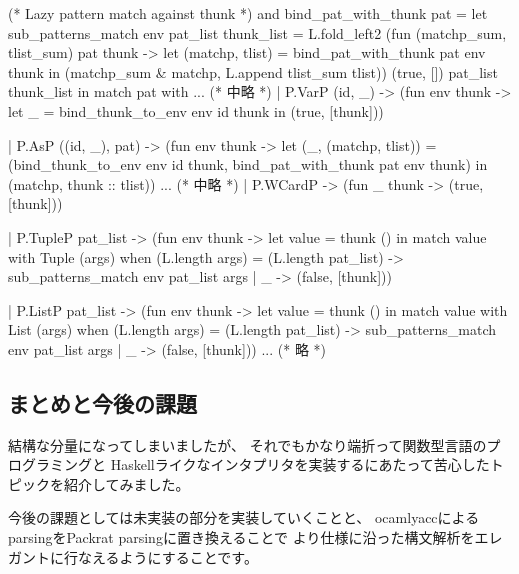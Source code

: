 \documentclass[mingoth,a4paper]{jsarticle}
\begin{document}
\begin{commandline}
(* Lazy pattern match against thunk *)
and bind_pat_with_thunk pat =
  let sub_patterns_match env pat_list thunk_list =
    L.fold_left2
      (fun (matchp_sum, tlist_sum) pat thunk ->
         let (matchp, tlist) = bind_pat_with_thunk pat env thunk in
           (matchp_sum & matchp, L.append tlist_sum tlist))
      (true, [])
      pat_list
      thunk_list
  in
    match pat with
... (* 中略 *)
      | P.VarP (id, _) ->
          (fun env thunk ->
             let _ = bind_thunk_to_env env id thunk in (true, [thunk]))

      | P.AsP ((id, _), pat) ->
          (fun env thunk ->
             let (_, (matchp, tlist)) = (bind_thunk_to_env env id thunk,
                                         bind_pat_with_thunk pat env thunk)
             in (matchp, thunk :: tlist))
... (* 中略 *)
      | P.WCardP ->
          (fun _ thunk -> (true, [thunk]))

      | P.TupleP pat_list ->
          (fun env thunk ->
             let value = thunk () in
               match value with
                   Tuple (args) when (L.length args) = (L.length pat_list)
                     -> sub_patterns_match env pat_list args
                 | _ -> (false, [thunk]))

      | P.ListP pat_list ->
          (fun env thunk -> 
             let value = thunk () in
               match value with
                   List (args) when (L.length args) = (L.length pat_list)
                     -> sub_patterns_match env pat_list args
                 | _ -> (false, [thunk]))
... (* 略 *)
\end{commandline}

\subsection{まとめと今後の課題}

結構な分量になってしまいましたが、
それでもかなり端折って関数型言語のプログラミングと
Haskellライクなインタプリタを実装するにあたって苦心したトピックを紹介してみました。

今後の課題としては未実装の部分を実装していくことと、
ocamlyaccによるparsingをPackrat parsingに置き換えることで
より仕様に沿った構文解析をエレガントに行なえるようにすることです。


\end{document}
